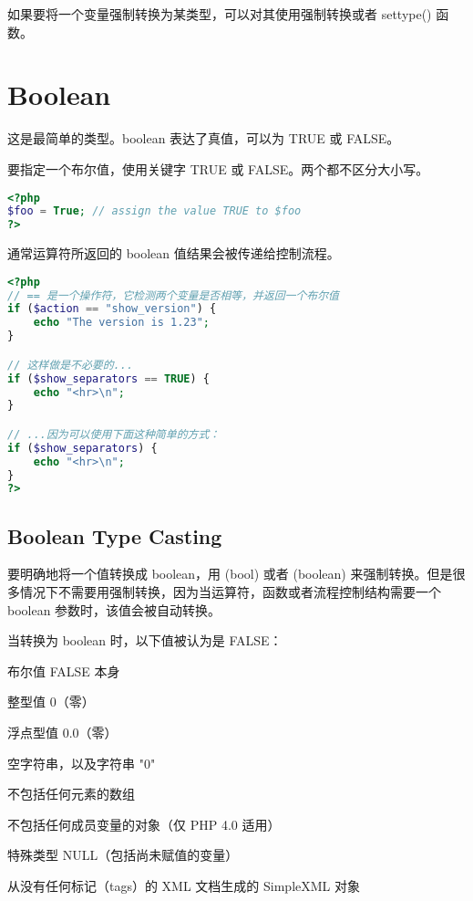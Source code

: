 如果要将一个变量强制转换为某类型，可以对其使用强制转换或者 settype() 函数。


\section{Boolean}

这是最简单的类型。boolean 表达了真值，可以为 TRUE 或 FALSE。

要指定一个布尔值，使用关键字 TRUE 或 FALSE。两个都不区分大小写。

\begin{lstlisting}[language=PHP]
<?php
$foo = True; // assign the value TRUE to $foo
?>
\end{lstlisting}

通常运算符所返回的 boolean 值结果会被传递给控制流程。

\begin{lstlisting}[language=PHP]
<?php
// == 是一个操作符，它检测两个变量是否相等，并返回一个布尔值
if ($action == "show_version") {
    echo "The version is 1.23";
}

// 这样做是不必要的...
if ($show_separators == TRUE) {
    echo "<hr>\n";
}

// ...因为可以使用下面这种简单的方式：
if ($show_separators) {
    echo "<hr>\n";
}
?>
\end{lstlisting}

\subsection{Boolean Type Casting}


要明确地将一个值转换成 boolean，用 (bool) 或者 (boolean) 来强制转换。但是很多情况下不需要用强制转换，因为当运算符，函数或者流程控制结构需要一个 boolean 参数时，该值会被自动转换。

当转换为 boolean 时，以下值被认为是 FALSE：

\begin{compactitem}
\item 布尔值 FALSE 本身
\item 整型值 0（零）
\item 浮点型值 0.0（零）
\item 空字符串，以及字符串 "0"
\item 不包括任何元素的数组
\item 不包括任何成员变量的对象（仅 PHP 4.0 适用）
\item 特殊类型 NULL（包括尚未赋值的变量）
\item 从没有任何标记（tags）的 XML 文档生成的 SimpleXML 对象
\end{compactitem}

